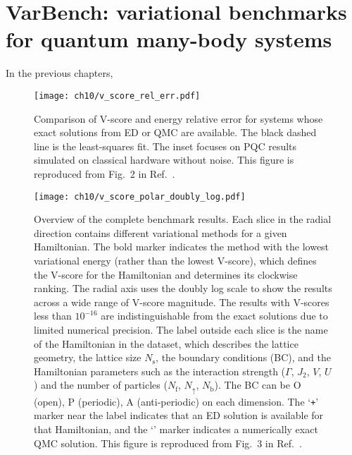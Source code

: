 \chapter{VarBench: variational benchmarks for quantum many-body systems}
\label{ch:varbench}

In the previous chapters,


\begin{figure}[htb]
\centering
\texttt{[image: ch10/v\_score\_rel\_err.pdf]}
\caption[Comparison of V-score and energy relative error]{
Comparison of V-score and energy relative error for systems whose exact solutions from ED or QMC are available.
The black dashed line is the least-squares fit.
The inset focuses on PQC results simulated on classical hardware without noise.
This figure is reproduced from Fig.~2 in Ref.~\cite{wu2023variational}.
}
\label{fig:v-score-rel-err}
\end{figure}

\begin{figure}[htb]
\centering
\hspace*{-0.05\linewidth}
\texttt{[image: ch10/v\_score\_polar\_doubly\_log.pdf]}
\caption[Overview of VarBench results]{
Overview of the complete benchmark results.
Each slice in the radial direction contains different variational methods for a given Hamiltonian. The bold marker indicates the method with the lowest variational energy (rather than the lowest V-score), which defines the V-score for the Hamiltonian and determines its clockwise ranking.
The radial axis uses the doubly log scale to show the results across a wide range of V-score magnitude.
The results with V-scores less than $10^{-16}$ are indistinguishable from the exact solutions due to limited numerical precision.
The label outside each slice is the name of the Hamiltonian in the dataset, which describes the lattice geometry, the lattice size $N_\text{s}$, the boundary conditions (BC), and the Hamiltonian parameters such as the interaction strength ($\Gamma$, $J_2$, $V$, $U$) and the number of particles ($N_\mathrm{f}$, $N_{\uparrow}$, $N_\mathrm{b}$).
The BC can be O (open), P (periodic), A (anti-periodic) on each dimension.
The `\texttt{+}' marker near the label indicates that an ED solution is available for that Hamiltonian, and the `\texttt{\textasteriskcentered}' marker indicates a numerically exact QMC solution.
This figure is reproduced from Fig.~3 in Ref.~\cite{wu2023variational}.
}
\label{fig:v-score}
\end{figure}

